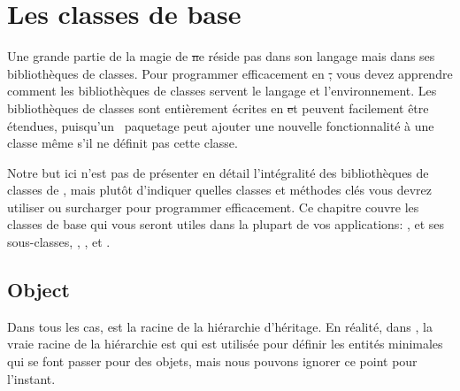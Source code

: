 \documentclass[a4paper,10pt,twoside]{book}
\begin{document}
	\renewcommand{\nnbb}[2]{} %
	\sloppy
\fi
\chapter{Les classes de base}
Une grande partie de la magie de \st ne réside pas dans son langage mais dans ses bibliothèques de classes. Pour programmer efficacement en \st, vous devez apprendre comment les bibliothèques de classes servent le langage et l'environnement. Les bibliothèques de classes sont entièrement écrites en \st et peuvent facilement être étendues, puisqu'un~ paquetage peut ajouter une nouvelle fonctionnalité à une classe même s'il ne définit pas cette classe. 

Notre but ici n'est pas de présenter en détail l'intégralité
des bibliothèques de classes de \pharo, mais plutôt d'indiquer
quelles classes et méthodes clés vous devrez utiliser ou surcharger 
pour programmer efficacement. Ce chapitre couvre les classes de base 
qui vous seront utiles dans la plupart de vos applications: ,  
et ses sous-classes, , ,  et .


\section{Object}

Dans tous les cas,  est la racine de la hiérarchie d'héritage. En réalité, dans \pharo , la vraie racine de la hiérarchie est  qui est utilisée pour définir les entités minimales qui se font passer pour des objets, mais nous pouvons ignorer ce point pour l'instant.
\end{document}
